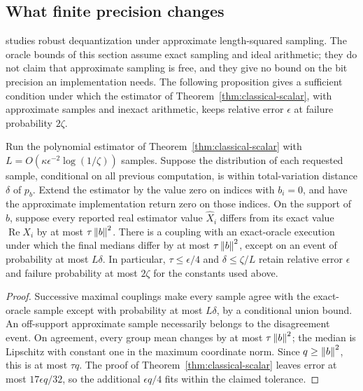 \subsection{What finite precision changes}\label{subsec:precision}
\citet{LeGall2025} studies robust dequantization under approximate
length-squared sampling. The oracle bounds of this section assume exact
sampling and ideal arithmetic; they do not claim that approximate
sampling is free, and they give no bound on the bit precision an
implementation needs. The following proposition gives a
sufficient condition under which the estimator of
Theorem~\ref{thm:classical-scalar}, with approximate samples and inexact
arithmetic, keeps relative error $\epsilon$ at failure probability $2\zeta$.
\begin{proposition}\label{prop:precision}
Run the polynomial estimator of Theorem~\ref{thm:classical-scalar} with
$L=O(\kappa\epsilon^{-2}\log(1/\zeta))$ samples. Suppose the distribution
of each requested sample, conditional on all previous computation, is
within total-variation distance $\delta$ of $p_b$. Extend the estimator by the value zero on
indices with $b_i=0$, and have the approximate implementation return zero
on those indices. On the support of $b$, suppose every reported real
estimator value $\widehat X_i$ differs from its exact value
$\operatorname{Re}X_i$ by at most $\tau\left\lVert b\right\rVert^2$.
There is a coupling with an exact-oracle execution under which the final
medians differ by at most $\tau\left\lVert b\right\rVert^2$, except on an event of
probability at most $L\delta$. In particular, $\tau\leq\epsilon/4$ and
$\delta\leq\zeta/L$ retain relative error $\epsilon$ and failure
probability at most $2\zeta$ for the constants used above.
\end{proposition}
\begin{proof}
Successive maximal couplings make every sample agree with the exact-oracle
sample except with probability at most $L\delta$, by a conditional union
bound. An off-support approximate sample necessarily belongs to the
disagreement event. On agreement, every group mean changes by at most
$\tau\left\lVert b\right\rVert^2$; the median is Lipschitz with constant one in the maximum
coordinate norm. Since $q\geq\left\lVert b\right\rVert^2$, this is at most $\tau q$.
The proof of Theorem~\ref{thm:classical-scalar} leaves error at most
$17\epsilon q/32$, so the additional $\epsilon q/4$ fits within the
claimed tolerance.
\end{proof}

